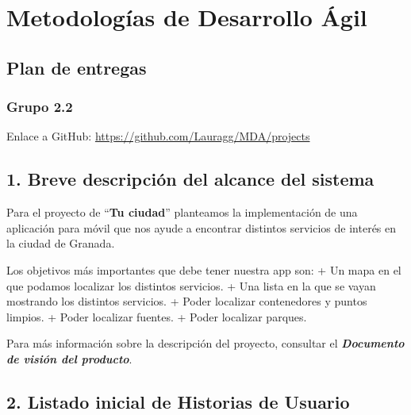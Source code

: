 \documentclass[
  a4paper,
,tablecaptionabove
]{scrartcl}
\date{}
\title{}
\author{}
\begin{document}




\hypertarget{metodologuxedas-de-desarrollo-uxe1gil}{%
\section{Metodologías de Desarrollo
Ágil}\label{metodologuxedas-de-desarrollo-uxe1gil}}

\hypertarget{plan-de-entregas}{%
\subsection{Plan de entregas}\label{plan-de-entregas}}

\hypertarget{grupo-2.2}{%
\subsubsection{Grupo 2.2}\label{grupo-2.2}}

Enlace a GitHub: 
\hypertarget{Enlace a Github}{%
\url{https://github.com/Lauragg/MDA/projects}\label{Enlace a Github}}

\hypertarget{breve-descripciuxf3n-del-alcance-del-sistema}{%
\subsection{1. Breve descripción del alcance del
sistema}\label{breve-descripciuxf3n-del-alcance-del-sistema}}

Para el proyecto de \enquote{\textbf{Tu ciudad}} planteamos la
implementación de una aplicación para móvil que nos ayude a encontrar
distintos servicios de interés en la ciudad de Granada.

Los objetivos más importantes que debe tener nuestra app son: + Un mapa
en el que podamos localizar los distintos servicios. + Una lista en la
que se vayan mostrando los distintos servicios. + Poder localizar
contenedores y puntos limpios. + Poder localizar fuentes. + Poder
localizar parques.

Para más información sobre la descripción del proyecto, consultar el
\textbf{\emph{Documento de visión del producto}}.

\hypertarget{listado-inicial-de-historias-de-usuario}{%
\subsection{2. Listado inicial de Historias de
Usuario}\label{listado-inicial-de-historias-de-usuario}}
\end{document}
